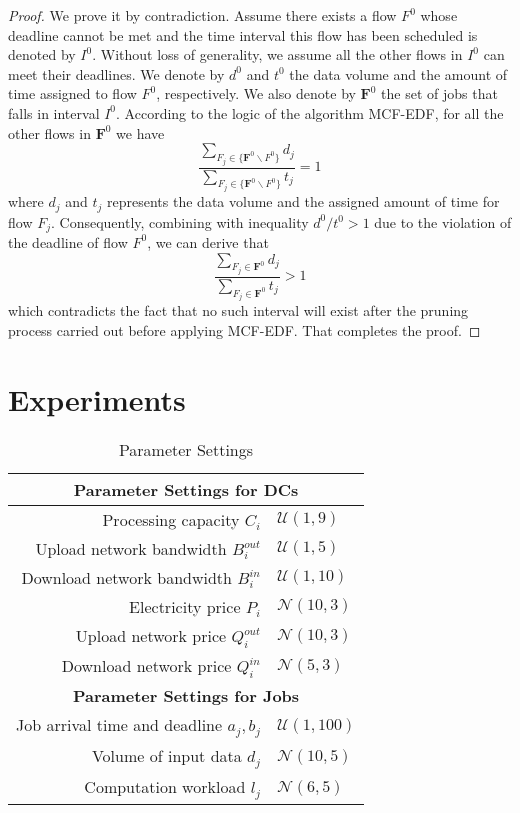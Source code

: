 \documentclass{article}
\begin{document}
\begin{proof}
We prove it by contradiction. Assume there exists a flow $F^0$ whose deadline cannot be met and the time interval this flow has been scheduled is denoted by $I^0$. Without loss of generality, we assume all the other flows in $I^0$ can meet their deadlines. We denote by $d^0$ and $t^0$ the data volume and the amount of time assigned to flow $F^0$, respectively. We also denote by $\mathbf{F}^0$ the set of jobs that falls in interval $I^0$. According to the logic of the algorithm MCF-EDF, for all the other flows in $\mathbf{F}^0$ we have 
\begin{equation}
\frac{\sum_{F_j \in \{\mathbf{F}^0 \backslash F^0\}} d_j}{\sum_{F_j \in \{\mathbf{F}^0 \backslash F^0\}} t_j} = 1
\end{equation}
where $d_j$ and $t_j$ represents the data volume and the assigned amount of time for flow $F_j$. Consequently, combining with inequality $d^0/t^0 > 1$ due to the violation of the deadline of flow $F^0$, we can derive that
\begin{equation}
\frac{\sum_{F_j \in \mathbf{F}^0} d_j}{\sum_{F_j \in \mathbf{F}^0} t_j} > 1
\end{equation}
which contradicts the fact that no such interval will exist after the pruning process carried out before applying MCF-EDF. That completes the proof.
\end{proof}



\section{Experiments}
\label{sec:exp}

\begin{table}
\caption{\label{tb:para}Parameter Settings}
\centering
\begin{tabular}{ r|l }
  \hline
  \multicolumn{2}{c}{\textbf{Parameter Settings for DCs}} \\
  \hline
  Processing capacity $C_i$ & $\mathcal{U}(1, 9)$ \\
  Upload network bandwidth $B_i^{out}$ & $\mathcal{U}(1, 5)$ \\
  Download network bandwidth $B_i^{in}$ & $\mathcal{U}(1, 10)$ \\
  Electricity price $P_i$ & $\mathcal{N}(10, 3)$ \\
  Upload network price $Q_i^{out}$ & $\mathcal{N}(10, 3)$ \\
  Download network price $Q_i^{in}$ & $\mathcal{N}(5, 3)$ \\
  \hline
  \hline
  \multicolumn{2}{c}{\textbf{Parameter Settings for Jobs}} \\
  \hline
  Job arrival time and deadline $a_j, b_j$ & $\mathcal{U}(1, 100)$ \\
  Volume of input data $d_j$ & $\mathcal{N}(10, 5)$ \\
  Computation workload $l_j$ & $\mathcal{N}(6, 5)$ \\
  \hline
\end{tabular}
\end{table}
\end{document}
